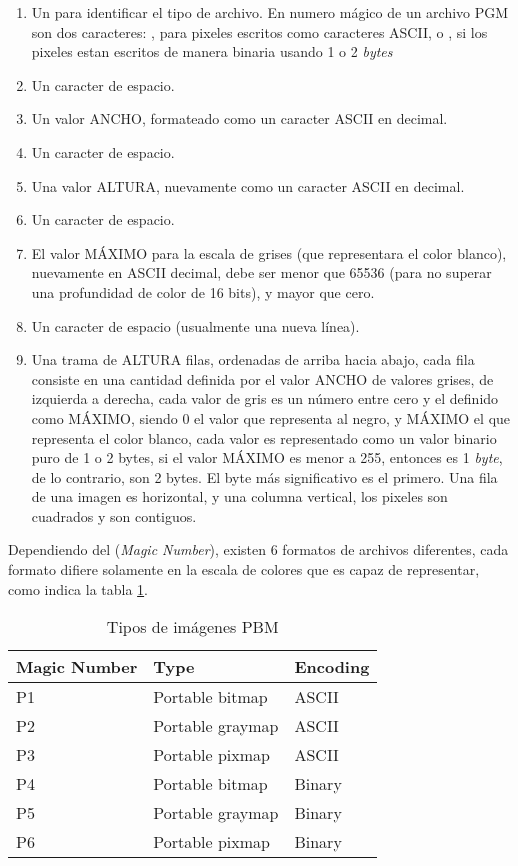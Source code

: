 \begin{enumerate}
	\item Un  para identificar el tipo de archivo. En numero mágico de un archivo PGM son dos caracteres: , para pixeles escritos como caracteres ASCII, o , si los pixeles estan escritos de manera binaria usando 1 o 2 \emph{bytes}
	\item Un caracter de espacio.
	\item Un valor ANCHO, formateado como un caracter ASCII en decimal.
	\item Un caracter de espacio.
	\item Una valor ALTURA, nuevamente como un caracter ASCII en decimal.
	\item Un caracter de espacio.
	\item El valor MÁXIMO para la escala de grises (que representara el color blanco), nuevamente en ASCII decimal, debe ser menor que 65536 (para no superar una profundidad de color de 16 bits), y mayor que cero.
	\item Un caracter de espacio (usualmente una nueva línea).
	\item Una trama de ALTURA filas, ordenadas de arriba hacia abajo, cada fila consiste en una cantidad definida por el valor ANCHO de valores grises, de izquierda a derecha, cada valor de gris es un número entre cero y el definido como MÁXIMO, siendo $0$ el valor que representa al negro, y MÁXIMO el que representa el color blanco, cada valor es representado como un valor binario puro de 1 o 2 bytes, si el valor MÁXIMO es menor a 255, entonces es 1 \emph{byte}, de lo contrario, son 2 bytes. El byte más significativo es el primero.
	Una fila de una imagen es horizontal, y una columna vertical, los pixeles son cuadrados y son contiguos.
\end{enumerate}

Dependiendo del  (\emph{Magic Number}), existen 6 formatos de archivos diferentes, cada formato difiere solamente en la escala de colores que es capaz de representar, como indica la tabla \ref{ch:implementacion:tabla:tiposdearchivospbm}.

\begin{table}[h]
	\centering
	\begin{tabular}{|l|l|l|}
		\hline
		Magic Number	&	Type				&	Encoding\\ \hline
		P1				&	Portable bitmap		&	ASCII \\ \hline
		P2				&	Portable graymap	&	ASCII \\ \hline
		P3				&	Portable pixmap		&	ASCII \\ \hline
		P4				&	Portable bitmap		&	Binary \\ \hline
		P5				&	Portable graymap	&	Binary \\ \hline
		P6				&	Portable pixmap		&	Binary \\ \hline
	\end{tabular}
	\caption{Tipos de imágenes PBM}
	\label{ch:implementacion:tabla:tiposdearchivospbm}
\end{table}


